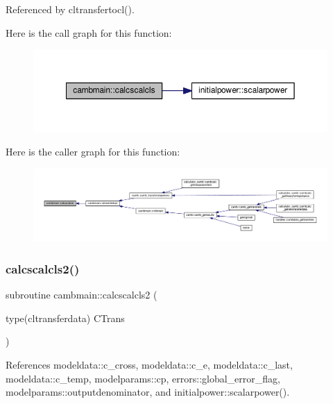 Referenced by cltransfertocl().

Here is the call graph for this function\+:
\nopagebreak
\begin{figure}[H]
\begin{center}
\leavevmode
\includegraphics[width=350pt]{namespacecambmain_a8b2cc98e7553a77d720caca21f5ae8e5_cgraph}
\end{center}
\end{figure}
Here is the caller graph for this function\+:
\nopagebreak
\begin{figure}[H]
\begin{center}
\leavevmode
\includegraphics[width=350pt]{namespacecambmain_a8b2cc98e7553a77d720caca21f5ae8e5_icgraph}
\end{center}
\end{figure}
\mbox{\label{namespacecambmain_a89e57ae788ae9b3065000febda0566a5}} 
\subsubsection{\texorpdfstring{calcscalcls2()}{calcscalcls2()}}
{\footnotesize\ttfamily subroutine cambmain\+::calcscalcls2 (\begin{DoxyParamCaption}\item[{type(cltransferdata)}]{C\+Trans }\end{DoxyParamCaption})}



References modeldata\+::c\+\_\+cross, modeldata\+::c\+\_\+e, modeldata\+::c\+\_\+last, modeldata\+::c\+\_\+temp, modelparams\+::cp, errors\+::global\+\_\+error\+\_\+flag, modelparams\+::outputdenominator, and initialpower\+::scalarpower().

